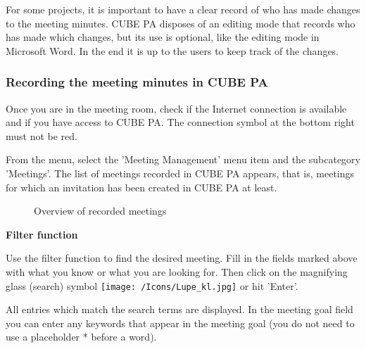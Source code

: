 For some projects, it is important to have a clear record of who has made changes to the meeting minutes. CUBE PA disposes of an editing mode that records who has made which changes, but its use is optional, like the editing mode in Microsoft Word. 
In the end it is up to the users to keep track of the changes.

\subsubsection{Recording the meeting minutes in CUBE PA}

Once you are in the meeting room, check if the Internet connection is available and if you have access to CUBE PA. The connection symbol at the bottom right must not be red.

\vspace{\baselineskip}

From the menu, select the 'Meeting Management' menu item and the subcategory 'Meetings'. The list of meetings recorded in CUBE PA appears, that is, meetings for which an invitation has been created in CUBE PA at least. 

\begin{figure}[H]
\caption{Overview of recorded meetings}
\end{figure}

\textbf{Filter function}

Use the filter function to find the desired meeting. Fill in the fields marked above with what you know or what you are looking for. Then click on the magnifying glass (search) symbol \texttt{[image: /Icons/Lupe\_kl.jpg]} or hit 'Enter'.

\vspace{\baselineskip}

All entries which match the search terms are displayed. In the meeting goal field you can enter any keywords that appear in the meeting goal (you do not need to use a placeholder * before a word).

